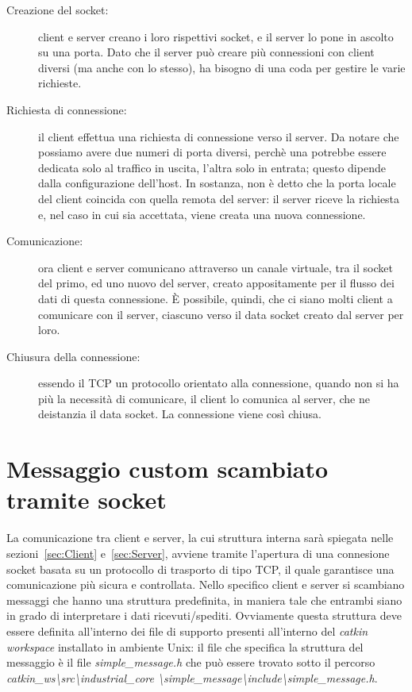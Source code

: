 \begin{description}
	\item[Creazione del socket:] client e server creano i loro rispettivi socket, e il server lo pone in ascolto su una porta.
	Dato che il server può creare più connessioni con client diversi (ma anche con lo stesso), ha bisogno di una coda per gestire le varie richieste.
	\item[Richiesta di connessione:] il client effettua una richiesta di connessione verso il server.
	Da notare che possiamo avere due numeri di porta diversi, perchè una potrebbe essere dedicata solo al traffico in uscita, l’altra solo in entrata; questo dipende dalla configurazione dell’host.
	In sostanza, non è detto che la porta locale del client coincida con quella remota del server: il server riceve la richiesta e, nel caso in cui sia accettata, viene creata una nuova connessione.
	\item[Comunicazione:] ora client e server comunicano attraverso un canale virtuale, tra il socket del primo, ed uno nuovo del server, creato appositamente per il flusso dei dati di questa connessione.
	È possibile, quindi, che ci siano molti client a comunicare con il server, ciascuno verso il data socket creato dal server per loro.
	\item[Chiusura della connessione:] essendo il TCP un protocollo orientato alla connessione, quando non si ha più la necessità di comunicare, il client lo comunica al server, che ne deistanzia il data socket.
	La connessione viene così chiusa.
\end{description}
\section{Messaggio custom scambiato tramite socket}
\label{text:MessaggeProtocol}
La comunicazione tra client e server, la cui struttura interna sarà spiegata nelle sezioni~\vref{sec:Client} e~\vref{sec:Server}, avviene tramite l'apertura di una connesione socket basata su un protocollo di trasporto di tipo TCP, il quale garantisce una comunicazione più sicura e controllata. Nello specifico client e server si scambiano messaggi che hanno una struttura predefinita, in maniera tale che entrambi siano in grado di interpretare i dati ricevuti/spediti.
Ovviamente questa struttura deve essere definita all'interno dei file di supporto presenti all'interno del \emph{catkin workspace} installato in ambiente Unix: il file che specifica la struttura del messaggio è il file \emph{simple\_message.h} che può essere trovato sotto il percorso \emph{ catkin\_ws\textbackslash src\textbackslash industrial\_core \textbackslash simple\_message\textbackslash include\textbackslash simple\_message.h}.

